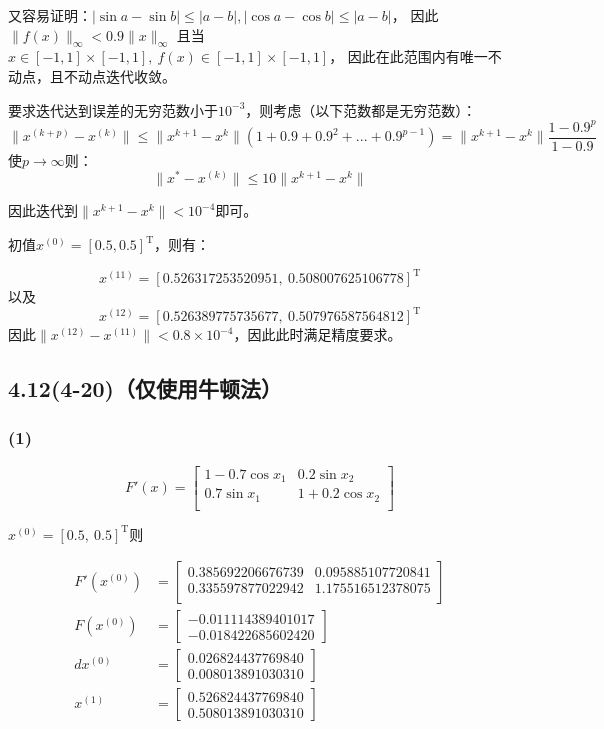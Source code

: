 \documentclass[UTF8,zihao=5]{ctexart}
\newcommand{\trans}[0]{^\mathrm{T}}
\begin{document}
又容易证明：$|\sin{a}-\sin{b}|\leq|a-b|, |\cos{a}-\cos{b}|\leq|a-b|$，
因此$\|f(x)\|_\infty<0.9\|x\|_\infty$
且当$x\in[-1,1]\times[-1,1],\ f(x)\in[-1,1]\times[-1,1]$，
因此在此范围内有唯一不动点，且不动点迭代收敛。

要求迭代达到误差的无穷范数小于$10^{-3}$，则考虑（以下范数都是无穷范数）：
$$
    \|x^{(k+p)}-x^{(k)}\|\leq \|x^{k+1}-x^{k}\|(1+0.9+0.9^2+...+0.9^{p-1})
    =
    \|x^{k+1}-x^{k}\| \frac{1-0.9^p}{1-0.9}
$$
使$p\rightarrow\infty$则：
$$
    \|x^*-x^{(k)}\|\leq
    10\|x^{k+1}-x^{k}\|
$$

因此迭代到$\|x^{k+1}-x^{k}\|<10^{-4}$即可。

初值$x^(0)=[0.5,0.5]\trans$，则有：

$$
    x^{(11)}=[0.526317253520951,\ 0.508007625106778]\trans
$$
以及
$$
    x^{(12)}=[0.526389775735677,\ 0.507976587564812]\trans
$$
因此$\|x^{(12)}-x^{(11)}\| < 0.8\times 10^{-4}$，因此此时满足精度要求。


\subsection*{4.12(4-20)（仅使用牛顿法）}

\subsubsection*{(1)}

$$
    F'(x)=\begin{bmatrix}
        1-0.7\cos{x_1} & 0.2\sin{x_2}   \\
        0.7\sin{x_1}   & 1+0.2\cos{x_2} \\
    \end{bmatrix}
$$

$x^{(0)}=[0.5,\ 0.5]\trans$则

$$
    \begin{aligned}
        F'(x^{(0)}) & =\begin{bmatrix}
            0.385692206676739 & 0.095885107720841 \\
            0.335597877022942 & 1.175516512378075 \\
        \end{bmatrix} \\
        F(x^{(0)})  & =\begin{bmatrix}
            -0.011114389401017 \\-0.018422685602420
        \end{bmatrix} \\
        dx^{(0)}    & =\begin{bmatrix}
            0.026824437769840 \\0.008013891030310
        \end{bmatrix} \\
        x^{(1)}     & =\begin{bmatrix}
            0.526824437769840 \\0.508013891030310
        \end{bmatrix} \\
    \end{aligned}
$$
\end{document}
